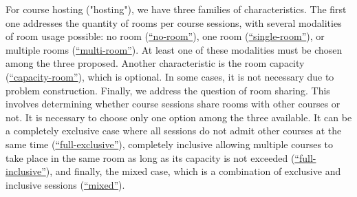 %
For course hosting ("hosting"), we have three families of characteristics. The first one addresses the quantity of rooms per course sessions, with several modalities of room usage possible: no room (\hyperref[featmodel:noroom]{``no-room''}), one room (\hyperref[featmodel:singleroom]{``single-room''}), or multiple rooms (\hyperref[featmodel:multiroom]{``multi-room''}). At least one of these modalities must be chosen among the three proposed. Another characteristic is the room capacity (\hyperref[featmodel:capacityroom]{``capacity-room''}), which is optional. In some cases, it is not necessary due to problem construction.
%
%
%
Finally, we address the question of room sharing. This involves determining whether course sessions share rooms with other courses or not. It is necessary to choose only one option among the three available. It can be a completely exclusive case where all sessions do not admit other courses at the same time (\hyperref[featmodel:exclusivesession]{``full-exclusive''}), completely inclusive allowing multiple courses to take place in the same room as long as its capacity is not exceeded (\hyperref[featmodel:inclusivesession]{``full-inclusive''}), and finally, the mixed case, which is a combination of exclusive and inclusive sessions (\hyperref[featmodel:mixedsession]{``mixed''}).

